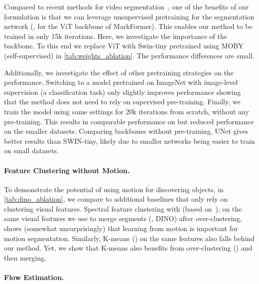 Compared to recent methods for video segmentation~\cite{yang2021self-supervised,meunier2022em-driven}, one of the benefits of our formulation is that we can leverage unsupervised pretraining for the segmentation network (\eg, for the ViT backbone of MarkFormer).
This enables our method to be trained in only 15k iterations.
Here, we investigate the importance of the backbone. To this end we replace ViT with Swin-tiny pretrained using MOBY (self-supervised) in \cref{tab:weights_ablation}. The performance differences are small.

Additionally, we investigate the effect of other pretraining strategies on the performance.
Switching to a model pretrained on ImageNet with image-level supervision (\ie a classification task) 
only slightly improves performance showing that the method does not need to rely on supervised pre-training. Finally, we train the model using same settings for 20k iterations from scratch, without any pre-training.
This results in comparable performance on \DAVIS but reduced performance on the smaller datasets.
Comparing backbones without pre-training, UNet gives better results than SWIN-tiny, likely due to smaller networks being easier to train on small datasets.








\paragraph{Feature Clustering without Motion.}
To demonstrate the potential of using motion for discovering objects, in \cref{tab:dino_ablation}, we compare to additional baselines that only rely on clustering visual features. Spectral feature clustering with  (based on~\cite{melas-kyriazi2022deep}), on the same visual features we use to merge segments (\ie, DINO) after over-clustering, shows (somewhat unsurprisingly) that learning from motion is important for motion segmentation. Similarly, K-means () on the same features also falls behind our method. Yet, we show that K-means also benefits from over-clustering () and then merging. 

\paragraph{Flow Estimation.}\label{sup:flow}

